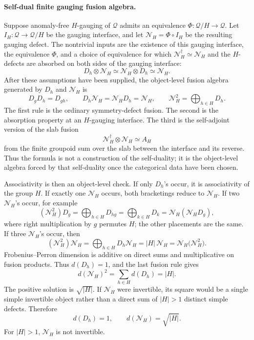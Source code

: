 \paragraph{Self-dual finite gauging fusion algebra.}
Suppose anomaly-free \(H\)-gauging of \(\mathcal Q\) admits an equivalence
\(\Phi:\mathcal Q/H\to\mathcal Q\).  Let
\(I_H:\mathcal Q\to\mathcal Q/H\) be the gauging interface, and let
\(\mathcal N_H=\Phi\circ I_H\) be the resulting gauging defect.  The
nontrivial inputs are the existence of this gauging interface, the equivalence
\(\Phi\), and a choice of equivalence for which
\(\mathcal N_H^\dagger\simeq\mathcal N_H\) and the \(H\)-defects are absorbed
on both sides of the gauging interface:
\[
  D_h\otimes\mathcal N_H\simeq
  \mathcal N_H\otimes D_h\simeq \mathcal N_H .
\]
After these assumptions have been supplied, the object-level fusion algebra
generated by \(D_h\) and \(\mathcal N_H\) is
\begin{equation}
  D_gD_h=D_{gh},\qquad
  D_h\mathcal N_H=\mathcal N_HD_h=\mathcal N_H,\qquad
  \mathcal N_H^2=\bigoplus_{h\in H}D_h .
  \label{eq:self-dual-finite-gauging-fusion-ring}
\end{equation}
The first rule is the ordinary symmetry-defect fusion.  The second is the
absorption property at an \(H\)-gauging interface.  The third is the
self-adjoint version of the slab fusion
\[
  \mathcal N_H^\dagger\otimes\mathcal N_H\simeq A_H
\]
from the finite groupoid sum over the slab between the interface and its
reverse.  Thus the formula is not a construction of the self-duality; it is
the object-level algebra forced by that self-duality once the categorical
data have been chosen.

Associativity is then an object-level check.  If only \(D_h\)'s occur, it is
associativity of the group \(H\).  If exactly one \(\mathcal N_H\) occurs, both
bracketings reduce to \(\mathcal N_H\).  If two \(\mathcal N_H\)'s occur, for
example
\[
  (\mathcal N_H^2)D_g
  =
  \bigoplus_{h\in H}D_{hg}
  =
  \bigoplus_{k\in H}D_k
  =
  \mathcal N_H(\mathcal N_HD_g),
\]
where right multiplication by \(g\) permutes \(H\); the other placements are
the same.  If three \(\mathcal N_H\)'s occur, then
\[
  (\mathcal N_H^2)\mathcal N_H
  =
  \bigoplus_{h\in H}D_h\mathcal N_H
  =
  |H|\,\mathcal N_H
  =
  \mathcal N_H\bigl(\mathcal N_H^2\bigr).
\]
Frobenius--Perron dimension is additive on direct sums and multiplicative on
fusion products.  Thus \(d(D_h)=1\), and the last fusion rule gives
\[
  d(\mathcal N_H)^2=\sum_{h\in H}d(D_h)=|H|.
\]
The positive solution is \(\sqrt{|H|}\).  If \(\mathcal N_H\) were invertible,
its square would be a single simple invertible object rather than a direct sum
of \(|H|>1\) distinct simple defects.  Therefore
\[
  d(D_h)=1,\qquad d(\mathcal N_H)=\sqrt{|H|}.
\]
For \(|H|>1\), \(\mathcal N_H\) is not invertible.

